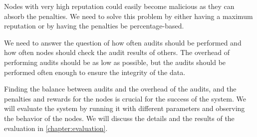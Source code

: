 Nodes with very high reputation could easily become malicious as they can absorb the penalties.
We need to solve this problem by either having a maximum reputation or by having the penalties be
percentage-based.

We need to answer the question of how often audits should be performed and how often nodes should
check the audit results of others.
The overhead of performing audits should be as low as possible, but the audits should be performed often enough
to ensure the integrity of the data.

Finding the balance between audits and the overhead of the audits, and the penalties and rewards for the nodes
is crucial for the success of the system.
We will evaluate the system by running it with different parameters and observing the behavior of the nodes.
We will discuss the details and the results of the evaluation in \ref{chapter:evaluation}.
